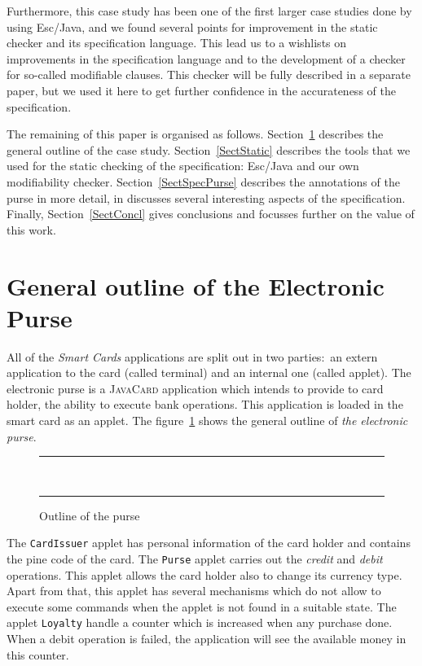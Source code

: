 \documentclass[a4paper]{llncs}
\newcommand{\comment}[1]{\marginpar{\framebox{\begin{minipage}{\marginparwidth}{#1}\end{minipage}}}}
\begin{document}
Furthermore, this case study has been one of the first larger case
studies done by using Esc/Java\comment{Is this correct?}, and we found
several points for improvement in the static checker and its
specification language. This lead us to a wishlists on improvements in
the specification language and to the development of a checker for
so-called modifiable clauses. This checker will be fully described in
a separate paper, but we used it here to get further confidence in the
accurateness of the specification.

The remaining of this paper is organised as
follows. Section~\ref{SectGenPurse} describes the general outline of
the case study. Section~\ref{SectStatic} describes the tools that we
used for the static checking of the specification: Esc/Java and our
own modifiability checker. Section~\ref{SectSpecPurse} describes the
annotations of the purse in more detail, in discusses several
interesting aspects of the specification. Finally,
Section~\ref{SectConcl} gives conclusions and focusses further on the
value of this work.



\section{General outline of the Electronic Purse}
\label{SectGenPurse}
All of the \textit{Smart Cards} applications are split out in two
parties$:$ an extern application to the card (called terminal) and an
internal one (called applet). The electronic purse is a
\textsc{JavaCard} application which intends to provide to card holder,
the ability to execute bank operations. This application is loaded in
the smart card as an applet. The figure~\ref{fig-cas-pur} shows the
general outline of \textit{the electronic purse}.




\begin{center}
\begin{figure}[hbt]
\rule{\linewidth}{0.3mm}
\\[2.5ex]
\centering
\caption{Outline of the purse}
\label{fig-cas-pur}
\rule{\linewidth}{0.3mm}
\end{figure}
\end{center}




The  \texttt{CardIssuer} applet has personal information of the card
holder and contains the pine code of the card. The \texttt{Purse}
applet carries out the \textit{credit} and \textit{debit}
operations. This applet allows the card holder also to change its
currency type. Apart from that, this applet has several mechanisms
which do not allow to execute some commands when the applet is not
found in a suitable state. The applet \texttt{Loyalty} handle a
counter which is increased when any purchase done. When
a debit operation is failed, the application will see the available
money in this counter.
\end{document}
